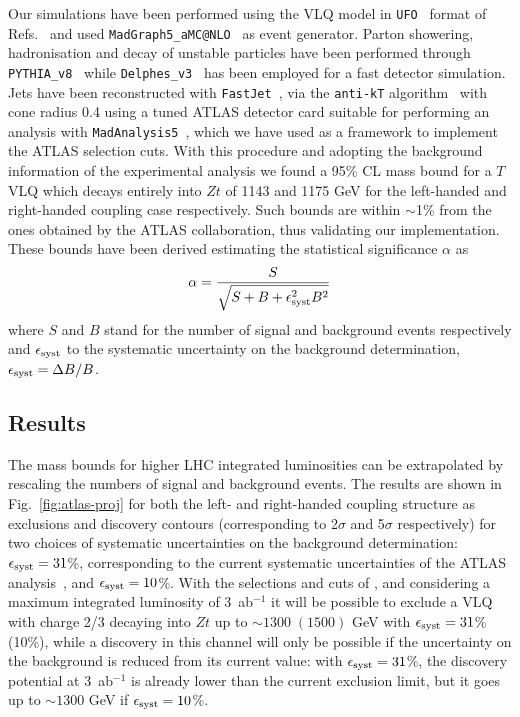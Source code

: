 \documentclass[a4paper]{article}
\begin{document}
Our simulations have been performed using the VLQ model in {\tt UFO}~\cite{Degrande:2011ua} format of Refs.~\cite{FeynRulesVLQ,Buchkremer:2013bha} and used {\tt MadGraph5\_aMC@NLO}~\cite{Alwall:2014hca} as event generator. Parton showering, hadronisation and decay of unstable particles have been performed through {\tt PYTHIA\_v8}~\cite{Sjostrand:2014zea} while {\tt Delphes\_v3}~\cite{deFavereau:2013fsa} has been employed for a fast detector simulation. Jets have been reconstructed with {\tt FastJet}~\cite{Cacciari:2011ma}, via the {\tt anti-kT} algorithm~\cite{Cacciari:2008gp} with cone radius 0.4 using a tuned ATLAS detector card suitable for performing an analysis with {\tt MadAnalysis5}~\cite{Conte:2012fm}, which we have used as a framework to implement the ATLAS selection cuts. With this procedure and adopting the background information of the experimental analysis we found a 95\% CL mass bound for a $T$ VLQ which decays entirely into $Zt$ of 1143 and 1175 GeV for the left-handed and right-handed coupling case respectively.
Such bounds are within $\sim$1\% from the ones obtained by the ATLAS collaboration, thus validating our implementation.  These bounds have been derived estimating the statistical significance $\alpha$ as
\begin{equation}
\alpha = \frac{S}{\sqrt{S+B+ \epsilon_{\rm syst}^2 B^2}}
\end{equation}
where $S$ and $B$ stand for the number of signal and background events respectively and $\epsilon_{\rm syst}$ to the systematic uncertainty on the background determination, $\epsilon_{\rm syst}=\Delta B/B$. 

\subsection{Results}

The mass bounds for higher LHC integrated luminosities can be extrapolated by rescaling the numbers of signal and background events. The results are shown in Fig.~\ref{fig:atlas-proj} for both the left- and right-handed coupling structure as exclusions and discovery contours (corresponding to 2$\sigma$ and 5$\sigma$ respectively) for two choices of systematic uncertainties on the background determination: $\epsilon_{\rm syst}=31$\%, corresponding to the current systematic uncertainties of the ATLAS analysis~\cite{Aaboud:2017qpr}, and $\epsilon_{\rm syst}=10$\%.
With the selections and cuts of \cite{Aaboud:2017qpr}, and considering a maximum integrated luminosity of 3~ab$^{-1}$ it will be possible to exclude a VLQ with charge 2/3 decaying into $Zt$ up to $\sim 1300\;(1500)$ GeV with $ \epsilon_{\rm syst}=31$\% (10\%), while a discovery in this channel will only be possible if the uncertainty on the background is reduced from its current value: with $ \epsilon_{\rm syst}=31$\%, the discovery potential at 3~ab$^{-1}$ is already lower than the current exclusion limit, but it goes up to $\sim 1300$ GeV if $ \epsilon_{\rm syst}=10$\%. 
\end{document}
